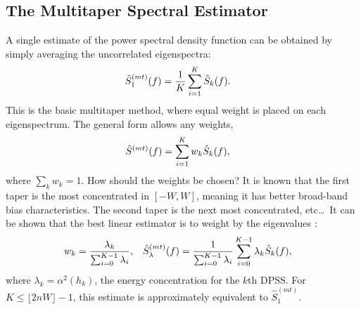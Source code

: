 \subsection{The Multitaper Spectral Estimator}

A single estimate of the power spectral density function can be obtained by simply averaging the uncorrelated eigenspectra:
\begin{align}
    \hat{S}_1^{(mt)}(f) & = \frac{1}{K}\sum_{i=1}^K \hat{S}_k(f).\index{multitaper spectral estimator!equal weighting}
\end{align}
This is the basic multitaper method, where equal weight is placed on each eigenspectrum.  The general form allows any weights,
\begin{align}
    \hat{S}^{(mt)}(f) & = \sum_{i=1}^K w_k\hat{S}_k(f),\index{multitaper spectral estimator!general form}
\end{align}
where $\sum_kw_k = 1$.  How should the weights be chosen?  It is known that the first taper is the most concentrated in $[-W,W]$, meaning it has better broad-band bias characteristics.  The second taper is the next most concentrated, etc\ldots\ It can be shown that the best linear estimator is to weight by the eigenvalues \cite{thomson:lecture}:
\begin{align}
    w_k & = \dfrac{\lambda_k}{\sum_{i=0}^{K-1}\lambda_i},  & \hat{S}_\lambda^{(mt)}(f)  & = \dfrac{1}{\sum_{i=0}^{K-1}\lambda_i}\sum_{i=0}^{K-1} \lambda_k \hat{S}_k(f),\index{multitaper spectral estimator!eigenvalue weighting}
\end{align}
where $\lambda_k=\alpha^2(h_k)$, the energy concentration for the $k$th DPSS.  For $K\leq\lfloor2nW\rfloor-1$, this estimate is approximately equivalent to $\hat{S}_1^{(mt)}$.  

